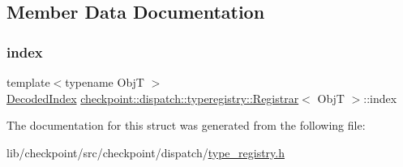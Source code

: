 \subsection{Member Data Documentation}
\mbox{\label{structcheckpoint_1_1dispatch_1_1typeregistry_1_1_registrar_ad2efba9399224c4fe27f1afdd89ecf0a}} 
\subsubsection{\texorpdfstring{index}{index}}
{\footnotesize\ttfamily template$<$typename ObjT $>$ \\
\hyperlink{namespacecheckpoint_1_1dispatch_1_1typeregistry_a3d1f57de0a997a245eb9e1db07b94140}{Decoded\+Index} \hyperlink{structcheckpoint_1_1dispatch_1_1typeregistry_1_1_registrar}{checkpoint\+::dispatch\+::typeregistry\+::\+Registrar}$<$ ObjT $>$\+::index}



The documentation for this struct was generated from the following file\+:\begin{DoxyCompactItemize}
\item 
lib/checkpoint/src/checkpoint/dispatch/\hyperlink{type__registry_8h}{type\+\_\+registry.\+h}\end{DoxyCompactItemize}
